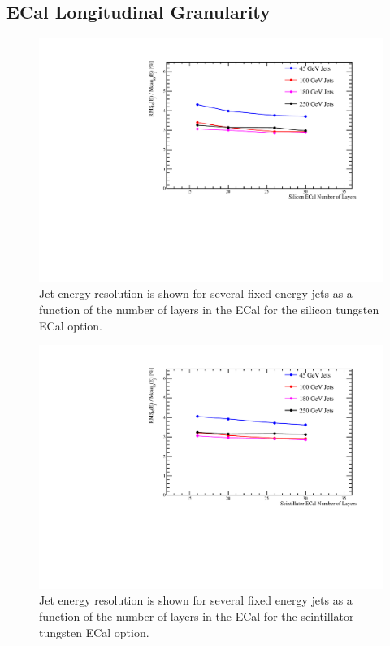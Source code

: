 \subsection{ECal Longitudinal Granularity}
\label{optstud:sec:ecal:nlayers}

\begin{figure}
  \includegraphics[width=\largefigwidth]{OptimisationStudies/Plots/JER_vs_SiliconECalNumberofLayers.pdf}
  \caption[Jet energy resolution as a function of the number of layers in the ECal for the silicon tungsten ECal option.]{Jet energy resolution is shown for several fixed energy jets as a function of the number of layers in the ECal for the silicon tungsten ECal option.}
  \label{optstud:fig:siecallayers}
\end{figure}

\begin{figure}
  \includegraphics[width=\largefigwidth]{OptimisationStudies/Plots/JER_vs_ScintillatorECalNumberofLayers.pdf}
  \caption[Jet energy resolution as a function of the number of layers in the ECal for the scintillator tungsten ECal option.]{Jet energy resolution is shown for several fixed energy jets as a function of the number of layers in the ECal for the scintillator tungsten ECal option.}
  \label{optstud:fig:scecallayers}
\end{figure}

